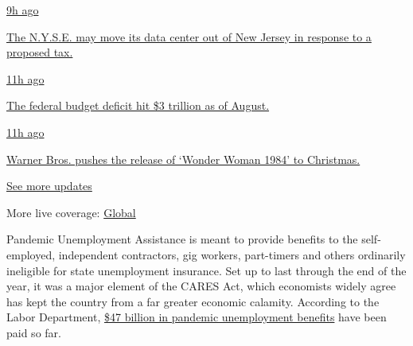\href{https://www.nytimes3xbfgragh.onion/live/2020/09/11/business/stock-market-today-coronavirus?action=click\&pgtype=Article\&state=default\&region=MAIN_CONTENT_1\&context=storylines_live_updates\#the-nyse-may-move-its-data-center-out-of-new-jersey-in-response-to-a-proposed-tax}{9h
ago}

\href{https://www.nytimes3xbfgragh.onion/live/2020/09/11/business/stock-market-today-coronavirus?action=click\&pgtype=Article\&state=default\&region=MAIN_CONTENT_1\&context=storylines_live_updates\#the-nyse-may-move-its-data-center-out-of-new-jersey-in-response-to-a-proposed-tax}{The
N.Y.S.E. may move its data center out of New Jersey in response to a
proposed tax.}

\href{https://www.nytimes3xbfgragh.onion/live/2020/09/11/business/stock-market-today-coronavirus?action=click\&pgtype=Article\&state=default\&region=MAIN_CONTENT_1\&context=storylines_live_updates\#the-federal-budget-deficit-hit-3-trillion-as-of-august}{11h
ago}

\href{https://www.nytimes3xbfgragh.onion/live/2020/09/11/business/stock-market-today-coronavirus?action=click\&pgtype=Article\&state=default\&region=MAIN_CONTENT_1\&context=storylines_live_updates\#the-federal-budget-deficit-hit-3-trillion-as-of-august}{The
federal budget deficit hit \$3 trillion as of August.}

\href{https://www.nytimes3xbfgragh.onion/live/2020/09/11/business/stock-market-today-coronavirus?action=click\&pgtype=Article\&state=default\&region=MAIN_CONTENT_1\&context=storylines_live_updates\#warner-bros-pushes-the-release-of-wonder-woman-1984-to-christmas}{11h
ago}

\href{https://www.nytimes3xbfgragh.onion/live/2020/09/11/business/stock-market-today-coronavirus?action=click\&pgtype=Article\&state=default\&region=MAIN_CONTENT_1\&context=storylines_live_updates\#warner-bros-pushes-the-release-of-wonder-woman-1984-to-christmas}{Warner
Bros. pushes the release of `Wonder Woman 1984' to Christmas.}

\href{https://www.nytimes3xbfgragh.onion/live/2020/09/11/business/stock-market-today-coronavirus?action=click\&pgtype=Article\&state=default\&region=MAIN_CONTENT_1\&context=storylines_live_updates}{See
more updates}

More live coverage:
\href{https://www.nytimes3xbfgragh.onion/2020/09/11/world/covid-19-coronavirus.html?action=click\&pgtype=Article\&state=default\&region=MAIN_CONTENT_1\&context=storylines_live_updates}{Global}

Pandemic Unemployment Assistance is meant to provide benefits to the
self-employed, independent contractors, gig workers, part-timers and
others ordinarily ineligible for state unemployment insurance. Set up to
last through the end of the year, it was a major element of the CARES
Act, which economists widely agree has kept the country from a far
greater economic calamity. According to the Labor Department,
\href{https://oui.doleta.gov/unemploy/docs/cares_act_funding_state.html}{\$47
billion in pandemic unemployment benefits} have been paid so far.

